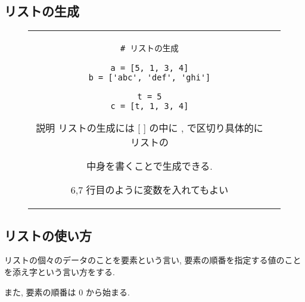 \documentclass{jsarticle}
\begin{document}
\subsection{リストの生成} \vspace{-10mm}
\begin{figure}[h]
	\begin{tabular}{cc}
		\begin{minipage}[t]{.4\textwidth}
			\begin{lstlisting}[caption=リストの生成]
# リストの生成

a = [5, 1, 3, 4]
b = ['abc', 'def', 'ghi']

t = 5
c = [t, 1, 3, 4]
\end{lstlisting}
		\end{minipage} \hspace{5mm}
		\begin{minipage}[t]{.6\textwidth}
			\begin{itembox}[l]{説明}
				リストの生成には [ ] の中に {\LARGE ,} で区切り具体的にリストの \par
				中身を書くことで生成できる. \par
				6,7 行目のように変数を入れてもよい
			\end{itembox}
		\end{minipage}
	\end{tabular}
\end{figure}


\subsection{リストの使い方}
リストの個々のデータのことを要素という言い, 要素の順番を指定する値のことを添え字という言い方をする.  \par
また, 要素の順番は 0 から始まる.
\end{document}
